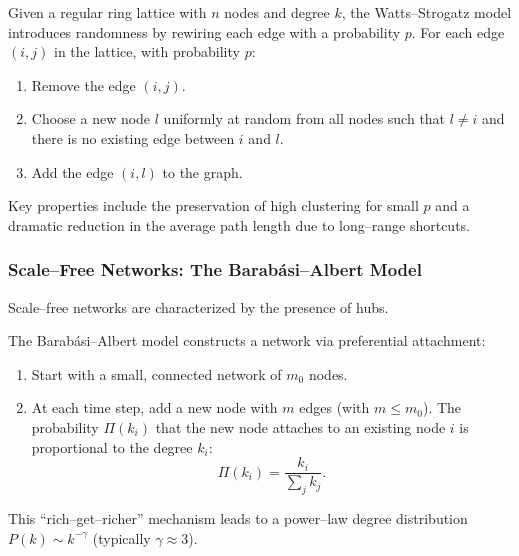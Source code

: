\documentclass[10pt, headings=standardclasses, parskip=half, twoside]{scrartcl}
\renewcommand{\emph}[1]{\textcolor{mypurple}{#1}}
\begin{document}
\begin{definition}\label{def:WS}
Given a regular ring lattice with \(n\) nodes and degree \(k\), the Watts–Strogatz model introduces randomness by \emph{rewiring} each edge with a probability \(p\). 
For each edge \((i,j)\) in the lattice, with probability \(p\):
\begin{enumerate}[label=\arabic*., before={\parskip = 0em}, nosep]
  \item Remove the edge \((i,j)\).
  \item Choose a new node \(l\) uniformly at random from all nodes such that \(l \neq i\) and there is no existing edge between \(i\) and \(l\).
  \item Add the edge \((i,l)\) to the graph. \qedhere
\end{enumerate} 
\end{definition}

Key properties include the preservation of high clustering for small \(p\) and a dramatic reduction in the average path length due to long–range shortcuts.

\subsubsection{Scale–Free Networks: The Barabási–Albert Model}\label{subsubsec:BA}
Scale–free networks are characterized by the presence of hubs.

\begin{definition}\label{def:BA}
The Barabási–Albert model constructs a network via preferential attachment:
\begin{enumerate}[label=\arabic*.]
  \item Start with a small, connected network of \(m_0\) nodes.
  \item At each time step, add a new node with \(m\) edges (with \(m\le m_0\)). The probability \(\Pi(k_i)\) that the new node attaches to an existing node \(i\) is proportional to the degree \(k_i\):
  \[
  \Pi(k_i)=\frac{k_i}{\sum_j k_j}.
  \] \qedhere
\end{enumerate}
\end{definition}

This “rich–get–richer” mechanism leads to a power–law degree distribution \(P(k)\sim k^{-\gamma}\) (typically \(\gamma\approx 3\)).
\end{document}
